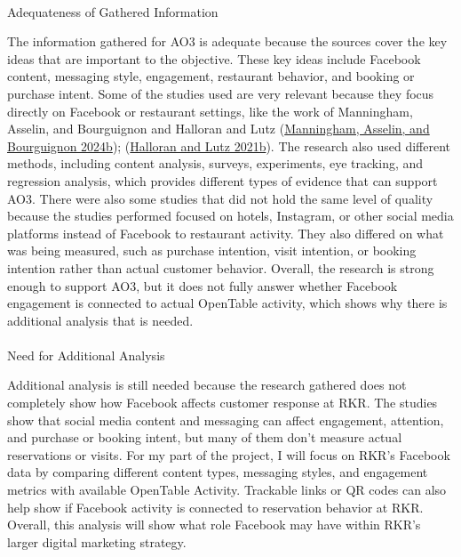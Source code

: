 \documentclass[
  12pt,
  letterpaper,
  DIV=11,
  numbers=noendperiod]{scrartcl}
\makeatletter
\let\oldparagraph\paragraph
\renewcommand{\paragraph}{
    \@ifstar
      \xxxParagraphStar
      \xxxParagraphNoStar
  }
\newcommand{\xxxParagraphStar}[1]{\oldparagraph*{#1}\mbox{}}
\newcommand{\xxxParagraphNoStar}[1]{\oldparagraph{#1}\mbox{}}
\makeatother
\begin{document}
\paragraph{Adequateness of Gathered
Information}\label{adequateness-of-gathered-information-2}

The information gathered for AO3 is adequate because the sources cover
the key ideas that are important to the objective. These key ideas
include Facebook content, messaging style, engagement, restaurant
behavior, and booking or purchase intent. Some of the studies used are
very relevant because they focus directly on Facebook or restaurant
settings, like the work of Manningham, Asselin, and Bourguignon and
Halloran and Lutz
(\href{file:///C:/Users/LAHUM/OneDrive/Desktop/IBM\%206500/RKR\%20CEP\%20Project/RKR\%20Project/index.html\#ref-manningham2024a}{Manningham,
Asselin, and Bourguignon 2024b});
(\href{file:///C:/Users/LAHUM/OneDrive/Desktop/IBM\%206500/RKR\%20CEP\%20Project/RKR\%20Project/index.html\#ref-halloran2021a}{Halloran
and Lutz 2021b}). The research also used different methods, including
content analysis, surveys, experiments, eye tracking, and regression
analysis, which provides different types of evidence that can support
AO3. There were also some studies that did not hold the same level of
quality because the studies performed focused on hotels, Instagram, or
other social media platforms instead of Facebook to restaurant activity.
They also differed on what was being measured, such as purchase
intention, visit intention, or booking intention rather than actual
customer behavior. Overall, the research is strong enough to support
AO3, but it does not fully answer whether Facebook engagement is
connected to actual OpenTable activity, which shows why there is
additional analysis that is needed.~

\paragraph{Need for Additional
Analysis}\label{need-for-additional-analysis-2}

Additional analysis is still needed because the research gathered does
not completely show how Facebook affects customer response at RKR. The
studies show that social media content and messaging can affect
engagement, attention, and purchase or booking intent, but many of them
don't measure actual reservations or visits. For my part of the project,
I will focus on RKR's Facebook data by comparing different content
types, messaging styles, and engagement metrics with available OpenTable
Activity. Trackable links or QR codes can also help show if Facebook
activity is connected to reservation behavior at RKR. Overall, this
analysis will show what role Facebook may have within RKR's larger
digital marketing strategy.
\end{document}
